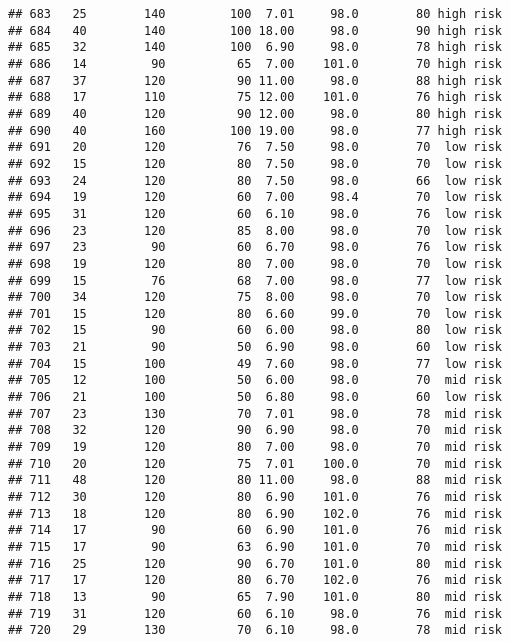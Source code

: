 \documentclass[
  ignorenonframetext,
]{beamer}
\begin{document}
\begin{frame}[fragile]
\begin{verbatim}
## 683   25        140         100  7.01     98.0        80 high risk
## 684   40        140         100 18.00     98.0        90 high risk
## 685   32        140         100  6.90     98.0        78 high risk
## 686   14         90          65  7.00    101.0        70 high risk
## 687   37        120          90 11.00     98.0        88 high risk
## 688   17        110          75 12.00    101.0        76 high risk
## 689   40        120          90 12.00     98.0        80 high risk
## 690   40        160         100 19.00     98.0        77 high risk
## 691   20        120          76  7.50     98.0        70  low risk
## 692   15        120          80  7.50     98.0        70  low risk
## 693   24        120          80  7.50     98.0        66  low risk
## 694   19        120          60  7.00     98.4        70  low risk
## 695   31        120          60  6.10     98.0        76  low risk
## 696   23        120          85  8.00     98.0        70  low risk
## 697   23         90          60  6.70     98.0        76  low risk
## 698   19        120          80  7.00     98.0        70  low risk
## 699   15         76          68  7.00     98.0        77  low risk
## 700   34        120          75  8.00     98.0        70  low risk
## 701   15        120          80  6.60     99.0        70  low risk
## 702   15         90          60  6.00     98.0        80  low risk
## 703   21         90          50  6.90     98.0        60  low risk
## 704   15        100          49  7.60     98.0        77  low risk
## 705   12        100          50  6.00     98.0        70  mid risk
## 706   21        100          50  6.80     98.0        60  low risk
## 707   23        130          70  7.01     98.0        78  mid risk
## 708   32        120          90  6.90     98.0        70  mid risk
## 709   19        120          80  7.00     98.0        70  mid risk
## 710   20        120          75  7.01    100.0        70  mid risk
## 711   48        120          80 11.00     98.0        88  mid risk
## 712   30        120          80  6.90    101.0        76  mid risk
## 713   18        120          80  6.90    102.0        76  mid risk
## 714   17         90          60  6.90    101.0        76  mid risk
## 715   17         90          63  6.90    101.0        70  mid risk
## 716   25        120          90  6.70    101.0        80  mid risk
## 717   17        120          80  6.70    102.0        76  mid risk
## 718   13         90          65  7.90    101.0        80  mid risk
## 719   31        120          60  6.10     98.0        76  mid risk
## 720   29        130          70  6.10     98.0        78  mid risk

\end{verbatim}
\end{frame}
\end{document}
